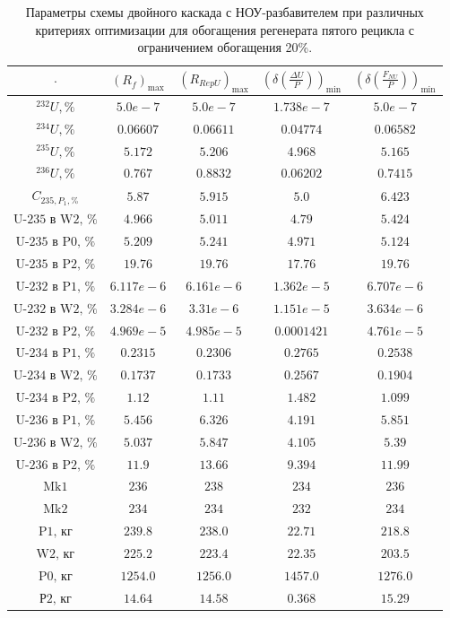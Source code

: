 \begin{table}
    \begin{tabular}{ccccc}
        $\cdot$ & $(R_f)_\text{max}$ & $(R_{RepU})_\text{max}$ & $(\delta(\frac{\Delta U}{P}))_\text{min}$ & $(\delta(\frac{F_{NU}}{P}))_\text{min}$\\ \hline
        $^{232}U, \%$ & $5.0e-7$ & $5.0e-7$ & $1.738e-7$ & $5.0e-7$\\ \hline
        $^{234}U, \%$ & $0.06607$ & $0.06611$ & $0.04774$ & $0.06582$\\ \hline
        $^{235}U, \%$ & $5.172$ & $5.206$ & $4.968$ & $5.165$\\ \hline
        $^{236}U, \%$ & $0.767$ & $0.8832$ & $0.06202$ & $0.7415$\\ \hline
        $C_{235,P_1, \%}$ & $5.87$ & $5.915$ & $5.0$ & $6.423$\\ \hline
        $\text{U-235 в W2, \%}$ & $4.966$ & $5.011$ & $4.79$ & $5.424$\\ \hline
        $\text{U-235 в P0, \%}$ & $5.209$ & $5.241$ & $4.971$ & $5.124$\\ \hline
        $\text{U-235 в P2, \%}$ & $19.76$ & $19.76$ & $17.76$ & $19.76$\\ \hline
        $\text{U-232 в P1, \%}$ & $6.117e-6$ & $6.161e-6$ & $1.362e-5$ & $6.707e-6$\\ \hline
        $\text{U-232 в W2, \%}$ & $3.284e-6$ & $3.31e-6$ & $1.151e-5$ & $3.634e-6$\\ \hline
        $\text{U-232 в P2, \%}$ & $4.969e-5$ & $4.985e-5$ & $0.0001421$ & $4.761e-5$\\ \hline
        $\text{U-234 в P1, \%}$ & $0.2315$ & $0.2306$ & $0.2765$ & $0.2538$\\ \hline
        $\text{U-234 в W2, \%}$ & $0.1737$ & $0.1733$ & $0.2567$ & $0.1904$\\ \hline
        $\text{U-234 в P2, \%}$ & $1.12$ & $1.11$ & $1.482$ & $1.099$\\ \hline
        $\text{U-236 в P1, \%}$ & $5.456$ & $6.326$ & $4.191$ & $5.851$\\ \hline
        $\text{U-236 в W2, \%}$ & $5.037$ & $5.847$ & $4.105$ & $5.39$\\ \hline
        $\text{U-236 в P2, \%}$ & $11.9$ & $13.66$ & $9.394$ & $11.99$\\ \hline
        $\text{Mk1}$ & $236$ & $238$ & $234$ & $236$\\ \hline
        $\text{Mk2}$ & $234$ & $234$ & $232$ & $234$\\ \hline
        $\text{P1, кг}$ & $239.8$ & $238.0$ & $22.71$ & $218.8$\\ \hline
        $\text{W2, кг}$ & $225.2$ & $223.4$ & $22.35$ & $203.5$\\ \hline
        $\text{P0, кг}$ & $1254.0$ & $1256.0$ & $1457.0$ & $1276.0$\\ \hline
        $\text{Р2, кг}$ & $14.64$ & $14.58$ & $0.368$ & $15.29$\\ \hline
    \end{tabular}
    \caption{Параметры схемы двойного каскада с НОУ-разбавителем при различных критериях оптимизации для обогащения регенерата пятого рецикла с ограничением обогащения 20\%.{\label{2opt5_20}}}
\end{table}


